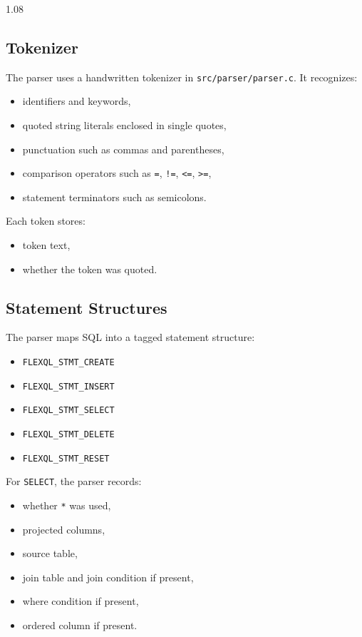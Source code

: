 \documentclass[11pt,a4paper]{article}
\begin{document}
\begin{spacing}{1.08}
\subsection{Tokenizer}

The parser uses a handwritten tokenizer in \texttt{src/parser/parser.c}. It recognizes:

\begin{itemize}
    \item identifiers and keywords,
    \item quoted string literals enclosed in single quotes,
    \item punctuation such as commas and parentheses,
    \item comparison operators such as \texttt{=}, \texttt{!=}, \texttt{<=}, \texttt{>=},
    \item statement terminators such as semicolons.
\end{itemize}

Each token stores:

\begin{itemize}
    \item token text,
    \item whether the token was quoted.
\end{itemize}

\subsection{Statement Structures}

The parser maps SQL into a tagged statement structure:

\begin{itemize}
    \item \texttt{FLEXQL\_STMT\_CREATE}
    \item \texttt{FLEXQL\_STMT\_INSERT}
    \item \texttt{FLEXQL\_STMT\_SELECT}
    \item \texttt{FLEXQL\_STMT\_DELETE}
    \item \texttt{FLEXQL\_STMT\_RESET}
\end{itemize}

For \texttt{SELECT}, the parser records:

\begin{itemize}
    \item whether \texttt{*} was used,
    \item projected columns,
    \item source table,
    \item join table and join condition if present,
    \item where condition if present,
    \item ordered column if present.
\end{itemize}


\end{spacing}
\end{document}
